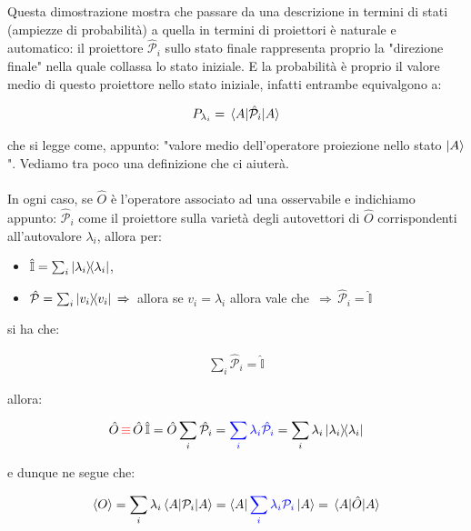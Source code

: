 	Questa dimostrazione mostra che passare da una descrizione in termini di stati (ampiezze di probabilità) a quella in termini di proiettori è naturale e automatico: il proiettore $\hat{\mathcal{P}}_i $ sullo stato finale rappresenta proprio la "direzione finale" nella quale collassa lo stato iniziale. E la probabilità è proprio il valore medio di questo proiettore nello stato iniziale, infatti entrambe equivalgono a:
	
\begin{align*}
	P_{\lambda_i} = \mel{A}{\hat{\mathcal{P}}_i}{A}
\end{align*}

	che si legge come, appunto: "valore medio dell'operatore proiezione nello stato $\ket{A}$". Vediamo tra poco una definizione che ci aiuterà. 
	\\
	\\		
	In ogni caso, se $\hat{O}$ è l'operatore associato ad una osservabile e indichiamo appunto: $\hat{\mathcal{P}}_i$ come il proiettore sulla varietà degli autovettori di $\hat{O}$ corrispondenti all'autovalore $\lambda_i$, allora per:
	
\begin{itemize}
	\item $\hat{\mathbb{I}} = \sum_i \ketbra{\lambda_i}$,
	\item $\hat{\mathcal{P}}= \sum_i \ketbra{v_i} \, \Rightarrow \,$ allora se $v_i = \lambda_i$ allora vale che $\, \Rightarrow \, \hat{\mathcal{P}}_i = \hat{\mathbb{I}} $
\end{itemize}
	
	si ha che:
	
\begin{align*}
	\sum_i \hat{\mathcal{P}}_i = \hat{\mathbb{I}}
\end{align*}

	allora:
	
\begin{align*}
	\hat{O} \, \textcolor{red}{\equiv} \, \hat{O} \, \hat{\mathbb{I}} = \hat{O} \sum_i \hat{\mathcal{P}}_i = \textcolor{blue}{\sum_i \lambda_i \hat{\mathcal{P}}_i} = \sum_i \lambda_i \ketbra{\lambda_i}
\end{align*}

	e dunque ne segue che:
	
\begin{align*}
	\langle O \rangle = \sum_i \lambda_i \mel{A}{\mathcal{P}_i}{A} = \bra{A} \textcolor{blue}{\sum_i \lambda_i \mathcal{P}_i} \ket{A} = \mel{A}{\hat{O}}{A}
\end{align*}

